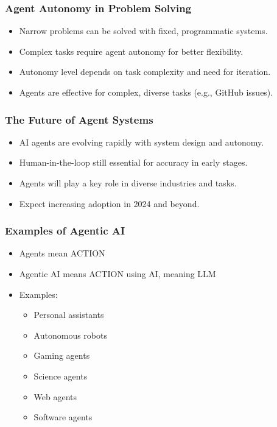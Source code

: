 \begin{frame}[fragile]\frametitle{Agent Autonomy in Problem Solving}
    \begin{itemize}
        \item Narrow problems can be solved with fixed, programmatic systems.
        \item Complex tasks require agent autonomy for better flexibility.
        \item Autonomy level depends on task complexity and need for iteration.
        \item Agents are effective for complex, diverse tasks (e.g., GitHub issues).
    \end{itemize}
\end{frame}

\begin{frame}[fragile]\frametitle{The Future of Agent Systems}
    \begin{itemize}
        \item AI agents are evolving rapidly with system design and autonomy.
        \item Human-in-the-loop still essential for accuracy in early stages.
        \item Agents will play a key role in diverse industries and tasks.
        \item Expect increasing adoption in 2024 and beyond.
    \end{itemize}
\end{frame}


\begin{frame}[fragile]\frametitle{Examples of Agentic AI}
  \begin{itemize}
  \item Agents mean ACTION
  \item Agentic AI means ACTION using AI, meaning LLM
  \item Examples:
  \begin{itemize}
    \item Personal assistants
    \item Autonomous robots
    \item Gaming agents
    \item Science agents
    \item Web agents
    \item Software agents
  \end{itemize}
    \end{itemize}

\end{frame}


